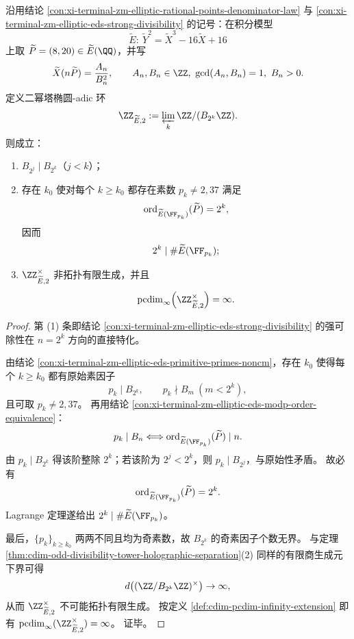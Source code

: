 \begin{theorem}\label{thm:cdim-leyang-elliptic-2power-tower-infinite-unit-pcdim}
沿用结论 \ref{con:xi-terminal-zm-elliptic-rational-points-denominator-law} 与
\ref{con:xi-terminal-zm-elliptic-eds-strong-divisibility} 的记号：在积分模型
\[
\widetilde E:\ \widetilde Y^2=\widetilde X^3-16\widetilde X+16
\]
上取 \(\widetilde P=(8,20)\in \widetilde E(\QQ)\)，并写
\[
\widetilde X(n\widetilde P)=\frac{A_n}{B_n^2},
\qquad
A_n,B_n\in\ZZ,\ \gcd(A_n,B_n)=1,\ B_n>0.
\]
定义二幂塔椭圆-adic 环
\[
\ZZ_{\widetilde E,2}:=\varprojlim_k \ZZ/(B_{2^k}\ZZ).
\]
则成立：
\begin{enumerate}
  \item \(B_{2^j}\mid B_{2^k}\)（\(j<k\)）；
  \item 存在 \(k_0\) 使对每个 \(k\ge k_0\) 都存在素数 \(p_k\neq 2,37\) 满足
  \[
  \operatorname{ord}_{\widetilde E(\FF_{p_k})}(\widetilde P)=2^k,
  \]
  因而
  \[
  2^k\mid \#\widetilde E(\FF_{p_k});
  \]
  \item \(\ZZ_{\widetilde E,2}^{\times}\) 非拓扑有限生成，并且
  \[
  \pcdim_{\infty}\!\left(\ZZ_{\widetilde E,2}^{\times}\right)=\infty.
  \]
\end{enumerate}
\end{theorem}
\begin{proof}
第 (1) 条即结论 \ref{con:xi-terminal-zm-elliptic-eds-strong-divisibility} 的强可除性在 \(n=2^k\) 方向的直接特化。
\par
由结论 \ref{con:xi-terminal-zm-elliptic-eds-primitive-primes-noncm}，存在 \(k_0\) 使得每个 \(k\ge k_0\) 都有原始素因子
\[
p_k\mid B_{2^k},\qquad p_k\nmid B_m\ (m<2^k),
\]
且可取 \(p_k\neq 2,37\)。
再用结论 \ref{con:xi-terminal-zm-elliptic-eds-modp-order-equivalence}：
\[
p_k\mid B_n
\Longleftrightarrow
\operatorname{ord}_{\widetilde E(\FF_{p_k})}(\widetilde P)\mid n.
\]
由 \(p_k\mid B_{2^k}\) 得该阶整除 \(2^k\)；若该阶为 \(2^j<2^k\)，则 \(p_k\mid B_{2^j}\)，与原始性矛盾。
故必有
\[
\operatorname{ord}_{\widetilde E(\FF_{p_k})}(\widetilde P)=2^k.
\]
Lagrange 定理遂给出 \(2^k\mid \#\widetilde E(\FF_{p_k})\)。
\par
最后，\(\{p_k\}_{k\ge k_0}\) 两两不同且均为奇素数，故 \(B_{2^k}\) 的奇素因子个数无界。
与定理 \ref{thm:cdim-odd-divisibility-tower-holographic-separation}(2) 同样的有限商生成元下界可得
\[
d\bigl((\ZZ/B_{2^k}\ZZ)^{\times}\bigr)\to\infty,
\]
从而 \(\ZZ_{\widetilde E,2}^{\times}\) 不可能拓扑有限生成。
按定义 \ref{def:cdim-pcdim-infinity-extension} 即有
\(
\pcdim_{\infty}(\ZZ_{\widetilde E,2}^{\times})=\infty
\)。
证毕。
\end{proof}

